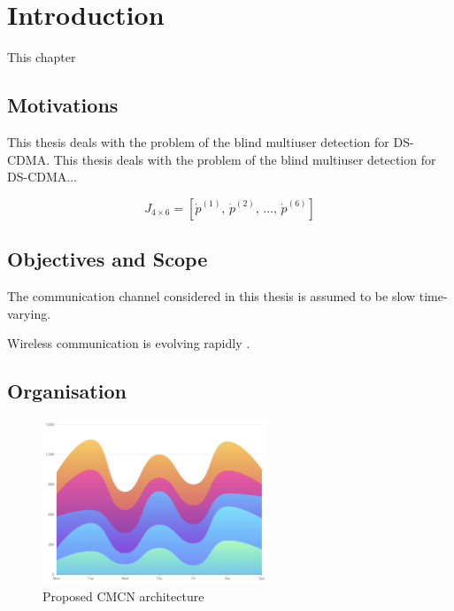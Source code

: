 \chapter{Introduction}
\begingroup
\justifying
\setlength{\parindent}{0pt}
\setlength{\parskip}{0.5\baselineskip}
\titlespacing{\chapter}{0pt}{0pt}{0pt}
\titlespacing{\section}{0pt}{0pt}{0pt}

This chapter \lipsum[1]

\section{Motivations}

This thesis deals with the problem of the blind multiuser detection for DS-CDMA. This thesis deals with the problem of the blind multiuser detection for DS-CDMA...

\begin{equation}
J_{4\times 6} = \left[\dot{p}^{(1)},\, \dot{p}^{(2)},\, \dots,\, \dot{p}^{(6)}\right]
\end{equation}

\lipsum[1-2]

\section{Objectives and Scope}

The communication channel considered in this thesis is assumed to be slow time-varying. \lipsum[1]

Wireless communication is evolving rapidly \cite{jordan2002,padgett1995}.

\section{Organisation}

\lipsum[1-2]

\begin{figure}[h]
    \centering
    \includegraphics[width=0.6\textwidth]{assets/figures/demo.png}
    \caption{Proposed CMCN architecture}
    \label{fig:cmcn}
\end{figure}

\endgroup